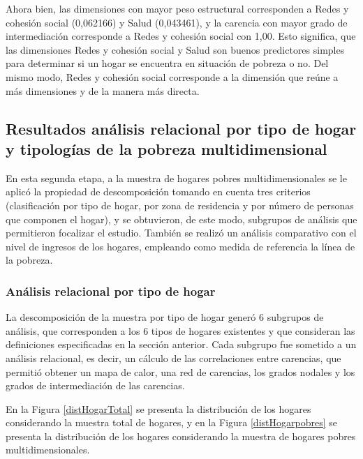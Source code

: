 \documentclass[12pt,letterpaper,spanish]{article}
\begin{document}
\begin{enumerate}
Ahora bien, las dimensiones con mayor peso estructural corresponden a Redes y cohesión social (0,062166) y Salud (0,043461), y la carencia con mayor grado de intermediación corresponde a Redes y cohesión social con 1,00. Esto significa, que las dimensiones Redes y cohesión social y Salud son buenos predictores simples para determinar si un hogar se encuentra en situación de pobreza o no. Del mismo modo, Redes y cohesión social corresponde a la dimensión que reúne a más dimensiones y de la manera más directa.

\end{enumerate}


\subsection{Resultados análisis relacional por tipo de hogar y tipologías de la pobreza multidimensional}
En esta segunda etapa, a la muestra de hogares pobres multidimensionales se le aplicó la propiedad de descomposición tomando en cuenta tres criterios (clasificación por tipo de hogar, por zona de residencia y por número de personas que componen el hogar), y se obtuvieron, de este modo, subgrupos de análisis que permitieron focalizar el estudio. También se realizó un análisis comparativo con el nivel de ingresos de los hogares, empleando como medida de referencia la línea de la pobreza.


\subsubsection{Análisis relacional por tipo de hogar}
La descomposición de la muestra por tipo de hogar generó 6 subgrupos de análisis, que corresponden a los 6 tipos de hogares existentes y que consideran las definiciones especificadas en la sección anterior. Cada subgrupo fue sometido a un análisis relacional, es decir, un cálculo de las correlaciones entre carencias, que permitió obtener un mapa de calor, una red de carencias, los grados nodales y los grados de intermediación de las carencias. 

En la Figura \ref{distHogarTotal} se presenta la distribución de los hogares considerando la muestra total de hogares, y en la Figura \ref{distHogarpobres} se presenta la distribución de los hogares considerando la muestra de hogares pobres multidimensionales. 
\end{document}
